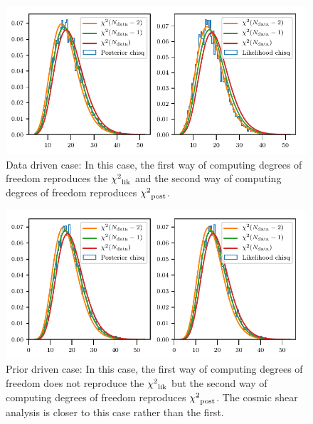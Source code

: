 \documentclass[11pt]{article}
\newcommand{\chisq}{{\chi^{2}}}
\begin{document}
\begin{figure}
\includegraphics[scale=0.9]{Data_driven.pdf}
\caption{Data driven case: In this case, the first way of computing degrees of
freedom reproduces the $\chisq_{\rm lik}$ and the second way of computing
degrees of freedom reproduces $\chisq_{\rm post}$.}
\label{fig1}
\end{figure}

\begin{figure}
\includegraphics[scale=0.9]{Prior_driven.pdf}
\caption{Prior driven case: In this case, the first way of computing degrees of
freedom does not reproduce the $\chisq_{\rm lik}$ but the second way of computing
degrees of freedom reproduces $\chisq_{\rm post}$. The cosmic shear analysis is
closer to this case rather than the first.}
\label{fig2}
\end{figure}
\end{document}
